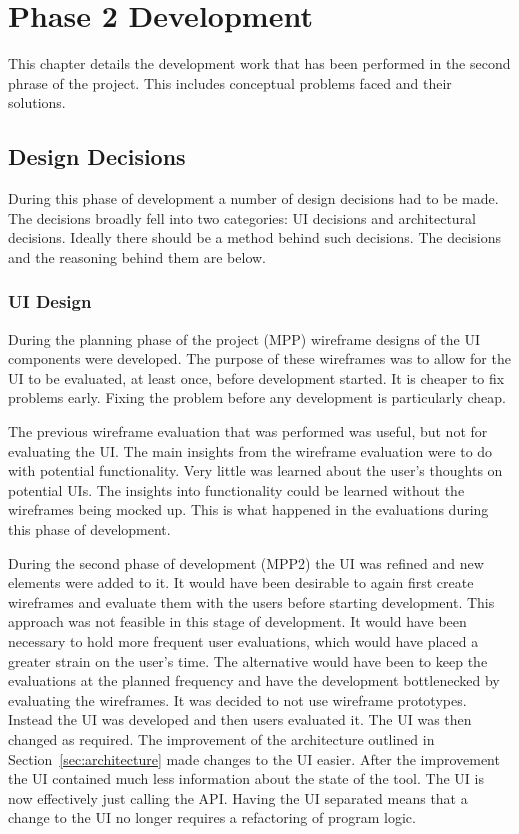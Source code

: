 \chapter{Phase 2 Development}
\label{chap:work}

This chapter details the development work that has been performed in the second phrase of the project.  This includes conceptual problems faced and their solutions.


\section{Design Decisions}
\label{sec:design}

During this phase of development a number of design decisions had to be made.  The decisions broadly fell into two categories:  \ac{UI} decisions and architectural decisions.  Ideally there should be a method behind such decisions.  The decisions and the reasoning behind them are below.

\subsection{\ac{UI} Design}

During the planning phase of the project (MPP) wireframe designs of the \ac{UI} components were developed.  The purpose of these wireframes was to allow for the \ac{UI} to be evaluated, at least once, before development started.  It is cheaper to fix problems early. Fixing the problem before any development is particularly cheap.

The previous wireframe evaluation that was performed was useful, but not for evaluating the \ac{UI}.  The main insights from the wireframe evaluation were to do with potential functionality.  Very little was learned about the user's thoughts on potential \acp{UI}.  The insights into functionality could be learned without the wireframes being mocked up.  This is what happened in the evaluations during this phase of development.

During the second phase of development (MPP2) the \ac{UI} was refined and new elements were added to it.  It would have been desirable to again first create wireframes and evaluate them with the users before starting development.  This approach was not feasible in this stage of development.  It would have been necessary to hold more frequent user evaluations, which would have placed a greater strain on the user's time.  The alternative would have been to keep the evaluations at the planned frequency and have the development bottlenecked by evaluating the wireframes.  It was decided to not use wireframe prototypes. Instead the \ac{UI} was developed and then users evaluated it.  The \ac{UI} was then changed as required.  The improvement of the architecture outlined in Section~\ref{sec:architecture} made changes to the \ac{UI} easier.  After the improvement the \ac{UI} contained much less information about the state of the tool.  The \ac{UI} is now effectively just calling the \ac{API}.  Having the \ac{UI} separated means that a change to the \ac{UI} no longer requires a refactoring of program logic.

